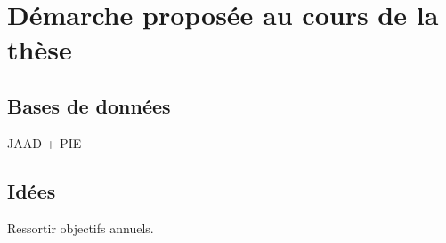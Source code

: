 \clearpage
\section{Démarche proposée au cours de la thèse}
\label{sec:SOTA}

\subsection{Bases de données}
JAAD + PIE

\subsection{Idées}
Ressortir objectifs annuels.